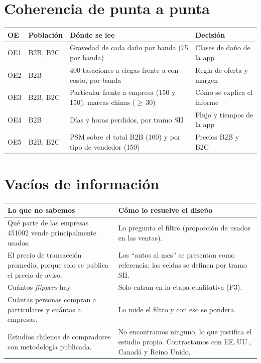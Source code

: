 \documentclass[11pt,a4paper]{article}
\begin{document}
\section{Coherencia de punta a punta}
\begin{center}\small
\begin{tabularx}{\textwidth}{@{}p{0.9cm}p{1.6cm}LL@{}}
\toprule
\textbf{OE} & \textbf{Población} & \textbf{Dónde se lee} & \textbf{Decisión}\\
\midrule
OE1 & B2B, B2C & Gravedad de cada daño por banda (75 por banda) & Clases de daño de la app\\
OE2 & B2B & 400 tasaciones a ciegas frente a con costo, por banda & Regla de oferta y margen\\
OE3 & B2B, B2C & Particular frente a empresa (150 y 150); marcas chinas ($\geq$\,30) & Cómo se explica el informe\\
OE4 & B2B & Días y horas perdidos, por tramo SII & Flujo y tiempos de la app\\
OE5 & B2B, B2C & PSM sobre el total B2B (100) y por tipo de vendedor (150) & Precios B2B y B2C\\
\bottomrule
\end{tabularx}
\end{center}

\section{Vacíos de información}
\begin{center}\small
\begin{tabularx}{\textwidth}{@{}LL@{}}
\toprule
\textbf{Lo que no sabemos} & \textbf{Cómo lo resuelve el diseño}\\
\midrule
Qué parte de las empresas 451002 vende principalmente usados. & Lo pregunta el filtro (proporción de usados en las ventas).\\
El precio de transacción promedio, porque solo se publica el precio de aviso. & Los \enquote{autos al mes} se presentan como referencia; las celdas se definen por tramo SII.\\
Cuántos \emph{flippers} hay. & Solo entran en la etapa cualitativa (P3).\\
Cuántas personas compran a particulares y cuántas a empresas. & Lo mide el filtro y con eso se pondera.\\
Estudios chilenos de compradores con metodología publicada. & No encontramos ninguno, lo que justifica el estudio propio. Contrastamos con EE.\,UU., Canadá y Reino Unido.\\
\bottomrule
\end{tabularx}
\end{center}
\end{document}
